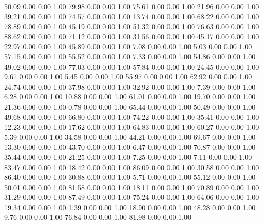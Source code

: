    50.09   0.00   0.00   1.00
   79.98   0.00   0.00   1.00
   75.61   0.00   0.00   1.00
   21.96   0.00   0.00   1.00
   39.21   0.00   0.00   1.00
   74.57   0.00   0.00   1.00
   13.74   0.00   0.00   1.00
   68.22   0.00   0.00   1.00
   78.89   0.00   0.00   1.00
   45.19   0.00   0.00   1.00
   51.32   0.00   0.00   1.00
   76.63   0.00   0.00   1.00
   88.62   0.00   0.00   1.00
   71.12   0.00   0.00   1.00
   31.56   0.00   0.00   1.00
   45.17   0.00   0.00   1.00
   22.97   0.00   0.00   1.00
   45.89   0.00   0.00   1.00
    7.08   0.00   0.00   1.00
    5.03   0.00   0.00   1.00
   57.15   0.00   0.00   1.00
   55.52   0.00   0.00   1.00
    7.33   0.00   0.00   1.00
   54.86   0.00   0.00   1.00
   49.02   0.00   0.00   1.00
   77.03   0.00   0.00   1.00
   57.84   0.00   0.00   1.00
   24.45   0.00   0.00   1.00
    9.61   0.00   0.00   1.00
    5.45   0.00   0.00   1.00
   55.97   0.00   0.00   1.00
   62.92   0.00   0.00   1.00
   24.74   0.00   0.00   1.00
   37.98   0.00   0.00   1.00
   32.92   0.00   0.00   1.00
    7.39   0.00   0.00   1.00
    6.28   0.00   0.00   1.00
   10.88   0.00   0.00   1.00
   61.01   0.00   0.00   1.00
   19.70   0.00   0.00   1.00
   21.36   0.00   0.00   1.00
    0.78   0.00   0.00   1.00
   65.44   0.00   0.00   1.00
   50.49   0.00   0.00   1.00
   49.68   0.00   0.00   1.00
   66.80   0.00   0.00   1.00
   74.22   0.00   0.00   1.00
   35.41   0.00   0.00   1.00
   12.23   0.00   0.00   1.00
   17.62   0.00   0.00   1.00
   64.83   0.00   0.00   1.00
   60.27   0.00   0.00   1.00
    5.39   0.00   0.00   1.00
   34.58   0.00   0.00   1.00
   44.21   0.00   0.00   1.00
   69.67   0.00   0.00   1.00
   13.30   0.00   0.00   1.00
   43.70   0.00   0.00   1.00
    6.47   0.00   0.00   1.00
   70.87   0.00   0.00   1.00
   35.44   0.00   0.00   1.00
   21.25   0.00   0.00   1.00
    7.25   0.00   0.00   1.00
    7.11   0.00   0.00   1.00
   83.47   0.00   0.00   1.00
   18.42   0.00   0.00   1.00
   86.09   0.00   0.00   1.00
   30.58   0.00   0.00   1.00
   86.40   0.00   0.00   1.00
   30.88   0.00   0.00   1.00
    5.71   0.00   0.00   1.00
   55.12   0.00   0.00   1.00
   50.01   0.00   0.00   1.00
   81.58   0.00   0.00   1.00
   18.11   0.00   0.00   1.00
   70.89   0.00   0.00   1.00
   31.29   0.00   0.00   1.00
   87.49   0.00   0.00   1.00
   75.24   0.00   0.00   1.00
   64.06   0.00   0.00   1.00
   19.34   0.00   0.00   1.00
    1.39   0.00   0.00   1.00
   18.90   0.00   0.00   1.00
   48.28   0.00   0.00   1.00
    9.76   0.00   0.00   1.00
   76.84   0.00   0.00   1.00
   81.98   0.00   0.00   1.00

